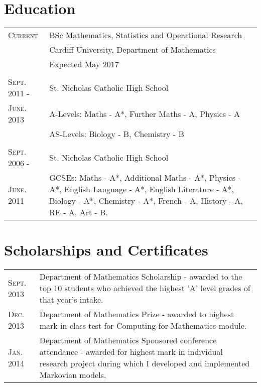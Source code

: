 \documentclass[a4paper]{article}
\begin{document}
\section{Education}
\begin{tabularx}{\textwidth}{lX}

\textsc{Current} & \textsc BSc Mathematics, Statistics and Operational Research \\
&\normalsize Cardiff University, Department of Mathematics\\
& Expected May 2017\\
\\
\textsc{Sept. 2011 -} & St. Nicholas Catholic High School\\
\textsc{June. 2013} & A-Levels: Maths - A*, Further Maths - A, Physics - A\\
& AS-Levels: Biology - B, Chemistry - B\\
\\
\textsc{Sept. 2006 -} & St. Nicholas Catholic High School\\
\textsc{June. 2011} & GCSEs: Maths - A*, Additional Maths - A*, Physics - A*, English Language - A*, English Literature - A*, Biology - A*, Chemistry - A*, French - A, History - A, RE - A, Art - B.\\

\end{tabularx}
\section{Scholarships and Certificates}
\begin{tabularx}{\textwidth}{lX}

\textsc{Sept.} 2013 & Department of Mathematics Scholarship - awarded to the top 10 students who achieved the highest 'A' level grades of that year's intake.\\
\textsc{Dec.} 2013 & Department of Mathematics Prize - awarded to highest mark in class test for Computing for Mathematics module.\\
\textsc{Jan.} 2014 & Department of Mathematics Sponsored conference attendance - awarded for highest mark in individual research project during which I developed and implemented Markovian models.\\

\end{tabularx}
\end{document}
